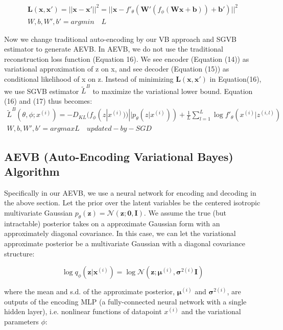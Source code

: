 \documentclass[11pt]{article}
\begin{document}
\begin{eqnarray}
\mathbf{L(x, x')} = ||\mathbf{x}-\mathbf{x'}||^2 = ||\mathbf{x}-f'_{\theta}(\mathbf{W'}(f_{\phi}(\mathbf{Wx+b}))+\mathbf{b'})||^2 \\
W,b,W',b' = argmin \quad L 
\end{eqnarray}


Now we change traditional auto-encoding by our VB approach and SGVB estimator to generate AEVB. In AEVB, we do not use the traditional reconstruction loss function (Equation 16). We see encoder (Equation (14)) as variational approximation of z on x, and see decoder (Equation (15)) as conditional likelihood of x on z. Instead of minimizing $\mathbf{L(x, x')}$ in Equation(16), we use SGVB estimator $\widetilde{L}^B$ to maximize the variational lower bound. Equation (16) and (17) thus becomes: 
\begin{eqnarray}
\widetilde{L}^B(\theta, \phi; x^{(i)})=-D_{KL}(f_\phi(z|x^{(i)}))||p_\theta(z|x^{(i)}))+\frac{1}{L}\sum^L_{l=1}\log f'_\theta (x^{(i)}|z^{(i, l)})\\
W,b,W',b' = argmax L  \quad updated-by-SGD
\end{eqnarray}


\subsection{AEVB (Auto-Encoding Variational Bayes) Algorithm}

Specifically in our AEVB,  we use a neural network for encoding and decoding in the above section. Let the prior over the latent variables be the centered isotropic multivariate Gaussian $p_\theta(\mathbf{z})=\mathcal{N}(\mathbf{z};\mathbf{0}, \mathbf{I})$. We assume the true (but intractable) posterior takes on a approximate Gaussian form with an approximately diagonal covariance. In this case, we can let the variational approximate posterior be a multivariate Gaussian with a diagonal covariance structure:

\begin{equation}
\log q_\phi(\mathbf{z}|\mathbf{x}^{(i)})=\log\mathcal{N}(\mathbf{z};\mathbf{\mu}^{(i)}, \mathbf{\sigma}^{2(i)}\mathbf{I})
\end{equation}

where the mean and s.d. of the approximate posterior, $\mathbf{\mu}^{(i)}$ and $\mathbf{\sigma}^{2(i)}$, are outputs of the encoding MLP (a fully-connected neural network with a single hidden layer), i.e. nonlinear functions of datapoint $x^{(i)}$ and the variational parameters $\phi$:
\end{document}
